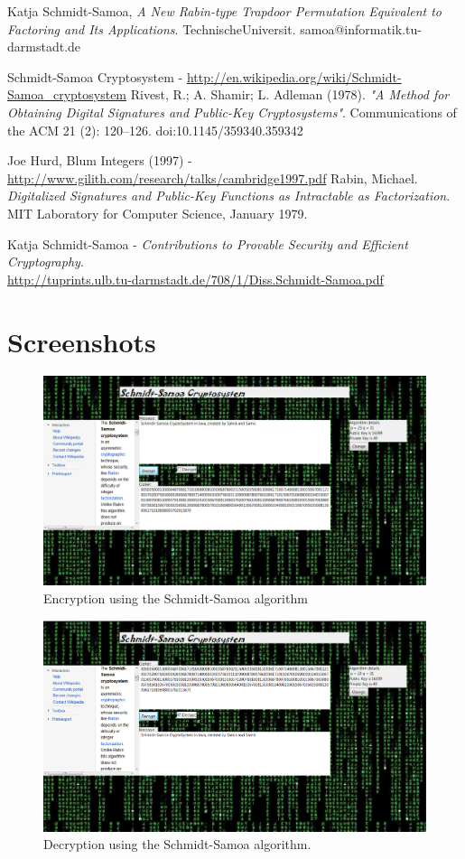 \documentclass[12pt]{article} %
\begin{document}


\begin{thebibliography}{9}
Katja Schmidt-Samoa, 
\emph{A New Rabin-type Trapdoor Permutation Equivalent to Factoring and Its Applications}. TechnischeUniversit. samoa@informatik.tu-darmstadt.de

  Schmidt-Samoa Cryptosystem - 
 \url{http://en.wikipedia.org/wiki/Schmidt-Samoa_cryptosystem}
 Rivest, R.; A. Shamir; L. Adleman (1978). \emph{"A Method for Obtaining Digital Signatures and Public-Key Cryptosystems"}. Communications of the ACM 21 (2): 120–126. doi:10.1145/359340.359342

 Joe Hurd, Blum Integers (1997) -  \url{http://www.gilith.com/research/talks/cambridge1997.pdf}
Rabin, Michael. \emph{Digitalized Signatures and Public-Key Functions as Intractable as Factorization}. MIT Laboratory for Computer Science, January 1979.

Katja Schmidt-Samoa - \emph{Contributions to Provable Security and Efficient Cryptography}.\\\url{http://tuprints.ulb.tu-darmstadt.de/708/1/Diss.Schmidt-Samoa.pdf}
\end{thebibliography}
\newpage
\section{Screenshots}
\begin{figure}[h!]
  \centering
   \includegraphics[scale=0.50]{encrypt.png}
  \caption{Encryption using the Schmidt-Samoa algorithm}
\end{figure}

\begin{figure}[h!]
  \centering
   \includegraphics[scale=0.50]{decrypt.png}
  \caption{Decryption using the Schmidt-Samoa algorithm.}
\end{figure}
\end{document}
